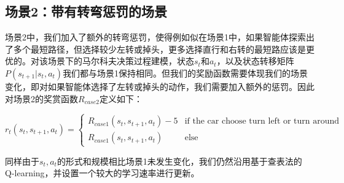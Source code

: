 \documentclass{standalone}
\begin{document}
\subsection{场景2：带有转弯惩罚的场景}
场景2中，我们加入了额外的转弯惩罚，使得例如似在场景1中，如果智能体探索出了多个最短路径，但选择较少左转或掉头，更多选择直行和右转的最短路应该是更优的。对该场景下的马尔科夫决策过程建模，状态$s_t$和$a_t$，以及状态转移矩阵$P(s_{t+1}|s_t, a_t)$我们都与场景1保持相同。但我们的奖励函数需要体现我们的场景变化，即对如果智能体选择了左转或掉头的动作，我们需要加入额外的惩罚。因此对场景2的奖赏函数$R_{case2}$定义如下：
\begin{center}
    \begin{equation}
    r_t(s_t, s_{t+1}, a_t) = \begin{cases}
     R_{case1}(s_t, s_{t+1}, a_t) - 5 &\mbox{if the car choose turn left or turn around}\\
     R_{case1}(s_t, s_{t+1}, a_t) &\mbox{else}
     \end{cases}
    \end{equation}
\end{center}
同样由于$s_t, a_t$的形式和规模相比场景1未发生变化，我们仍然沿用基于查表法的 Q-learning，并设置一个较大的学习速率进行更新。
\end{document}
